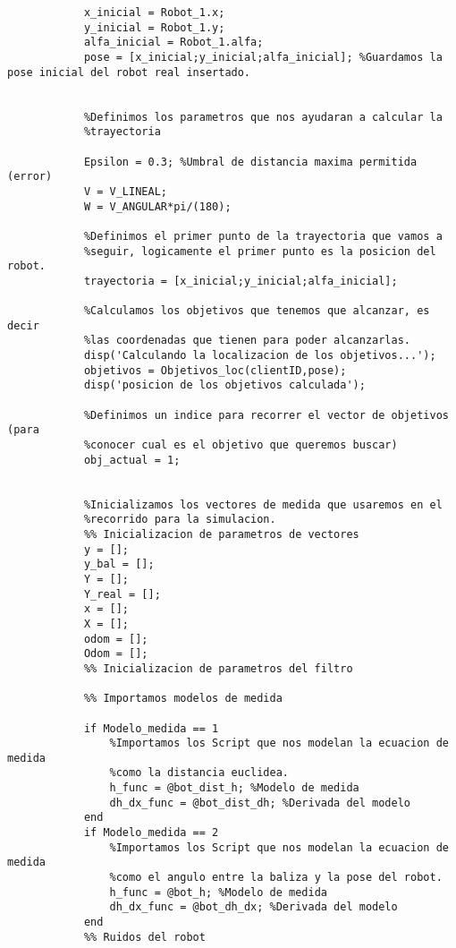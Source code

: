 \begin{lstlisting}[frame=single]
            %Definimos la pose inicial que tendra nuestro robot
            x_inicial = Robot_1.x;
            y_inicial = Robot_1.y;
            alfa_inicial = Robot_1.alfa;
            pose = [x_inicial;y_inicial;alfa_inicial]; %Guardamos la pose inicial del robot real insertado.


            %Definimos los parametros que nos ayudaran a calcular la
            %trayectoria

            Epsilon = 0.3; %Umbral de distancia maxima permitida (error)
            V = V_LINEAL;
            W = V_ANGULAR*pi/(180);

            %Definimos el primer punto de la trayectoria que vamos a
            %seguir, logicamente el primer punto es la posicion del robot.
            trayectoria = [x_inicial;y_inicial;alfa_inicial];

            %Calculamos los objetivos que tenemos que alcanzar, es decir
            %las coordenadas que tienen para poder alcanzarlas.
            disp('Calculando la localizacion de los objetivos...');
            objetivos = Objetivos_loc(clientID,pose);
            disp('posicion de los objetivos calculada');

            %Definimos un indice para recorrer el vector de objetivos (para
            %conocer cual es el objetivo que queremos buscar)
            obj_actual = 1;
            

            %Inicializamos los vectores de medida que usaremos en el
            %recorrido para la simulacion.
            %% Inicializacion de parametros de vectores
            y = [];
            y_bal = [];
            Y = [];
            Y_real = [];
            x = [];
            X = [];
            odom = [];
            Odom = [];
            %% Inicializacion de parametros del filtro
            
            %% Importamos modelos de medida
            
            if Modelo_medida == 1
                %Importamos los Script que nos modelan la ecuacion de medida
                %como la distancia euclidea.
                h_func = @bot_dist_h; %Modelo de medida
                dh_dx_func = @bot_dist_dh; %Derivada del modelo
            end
            if Modelo_medida == 2 
                %Importamos los Script que nos modelan la ecuacion de medida
                %como el angulo entre la baliza y la pose del robot.
                h_func = @bot_h; %Modelo de medida
                dh_dx_func = @bot_dh_dx; %Derivada del modelo
            end  
            %% Ruidos del robot
            

\end{lstlisting}

